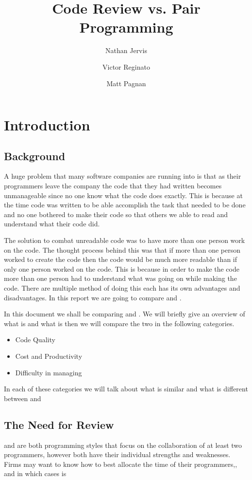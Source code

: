 \documentclass{article}
\title{Code Review vs. Pair Programming}
\author{Nathan Jervis \and Victor Reginato \and Matt Pagnan}
\begin{document}
\maketitle

\tableofcontents

\section{Introduction}

\subsection{Background}
A huge problem that many software companies are running into is that as their programmers leave the company the code that they had written becomes unmanageable since no one know what the code does exactly. This is because at the time code was written to be able accomplish the task that needed to be done and no one bothered to make their code so that others we able to read and understand what their code did.

The solution to combat unreadable code was to have more than one person work on the code. The thought process behind this was that if more than one person worked to create the code then the code would be much more readable than if only one person worked on the code. This is because in order to make the code more than one person had to understand what was going on while making the code. There are multiple method of doing this each has its own advantages and disadvantages. In this report we are going to compare \PP and \CR.

In this document we shall be comparing \PP and \CR. We will briefly give an overview of what \PP is and what \CR is then we will compare the two in the following categories.
\begin{itemize}
\item Code Quality
\item Cost and Productivity
\item Difficulty in managing
\end{itemize}

In each of these categories we will talk about what is similar and what is different between \PP and \CR 

\subsection{The Need for Review}
\PP and \CR are both programming styles that focus on the collaboration of at least two programmers, however both have their individual strengths and weaknesses. Firms may want to know how to best allocate the time of their programmers,, and in which cases \PP is 
\end{document}

